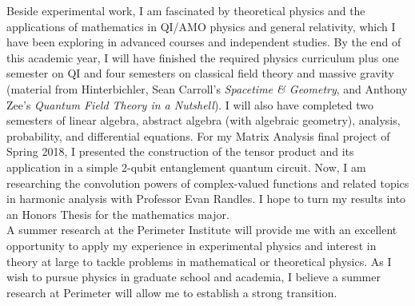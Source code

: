\documentclass[12pt]{article}
\begin{document}
Beside experimental work, I am fascinated by theoretical physics and the applications of mathematics in QI/AMO physics and general relativity, which I have been exploring in advanced courses and independent studies. By the end of this academic year, I will have finished the required physics curriculum plus one semester on QI and four semesters on classical field theory and massive gravity (material from Hinterbichler\cite{RevModPhys.84.671}, Sean Carroll's \textit{Spacetime \& Geometry}, and Anthony Zee's \textit{Quantum Field Theory in a Nutshell}). I will also have completed two semesters of linear algebra, abstract algebra (with algebraic geometry), analysis, probability, and differential equations. For my Matrix Analysis final project of Spring 2018, I presented the construction of the tensor product and its application in a simple 2-qubit entanglement quantum circuit. Now, I am researching the convolution powers of complex-valued functions and related topics in harmonic analysis with Professor Evan Randles. I hope to turn my results into an Honors Thesis for the mathematics major. \\

  
A summer research at the Perimeter Institute will provide me with an excellent opportunity to apply my experience in experimental physics and interest in theory at large to tackle problems in mathematical or theoretical physics. As I wish to pursue physics in graduate school and academia, I believe a summer research at Perimeter will allow me to establish a strong transition.










 

















	
	
	
	
	
\end{document}
